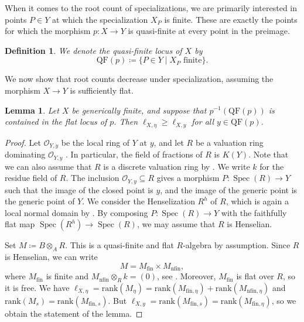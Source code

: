 \documentclass[12pt,reqno,a4paper]{amsart}
\theoremstyle{theoremstyle}
\newtheorem{lemma}[theorem]{Lemma}
\theoremstyle{examplestyle}
\newtheorem{definition}[theorem]{Definition}
\theoremstyle{algorithmstyle}
\DeclareMathOperator{\Spec}{Spec}
\begin{document}
When it comes to the root count of specializations, we are primarily interested in points $P\in Y$ at which the specialization $X_P$ is finite.  These are exactly the points for which the morphism $p\colon X\rightarrow Y$ is quasi-finite at every point in the preimage.

\begin{definition}
  \label{def:quasiFiniteLocus}
  We denote the \emph{quasi-finite locus} of $X$ by
  \begin{equation*}
    \mathrm{QF}(p)\coloneqq\{P\in{Y}\mid X_P \text{ finite}\}.
  \end{equation*}
\end{definition}

We now show that root counts decrease under specialization, assuming the morphism $X\rightarrow Y$ is sufficiently flat.

\begin{lemma}\label{lem:GRCDecreases2}
  Let $X$ be generically finite, and suppose that $p^{-1}(\mathrm{QF}(p))$ is contained in the flat locus of $p$.  Then $\ell_{X,\eta}\geq{\ell_{X,y}}$ for all $y\in{\mathrm{QF}(p)}$.
\end{lemma}
\begin{proof}
 Let $\mathcal{O}_{Y,y}$ be the local ring of $Y$ at $y$, and let $R$ be a valuation ring dominating $\mathcal{O}_{Y,y}$ \cite[\href{https://stacks.math.columbia.edu/tag/00IA}{Lemma 00IA}]{stacks-project}. In particular, the field of fractions of $R$ is $K(Y)$. Note that we can also assume that $R$ is a discrete valuation ring by \cite[\href{https://stacks.math.columbia.edu/tag/00PH}{Lemma 00PH}]{stacks-project}. We write $k$ for the residue field of $R$. The inclusion $\mathcal{O}_{Y,y}\subseteq R$ gives a morphism $P\colon\Spec(R)\to Y$ such that the image of the closed point is $y$, and the image of the generic point is the generic point of $Y$. We consider the Henselization $R^{h}$ of $R$, which is again a local normal domain by \cite[\href{https://stacks.math.columbia.edu/tag/06DI}{Lemma 06DI}]{stacks-project}. By composing $P\colon\Spec(R)\to Y$ with the faithfully flat map $\Spec(R^{h})\to \Spec(R)$, we may assume that $R$ is Henselian.     %
%

 Set $M\coloneqq B\otimes_A R$. %
 This is a quasi-finite and flat $R$-algebra by assumption. %
 Since $R$ is Henselian, we can write
 \begin{equation*}
     M=M_{\mathrm{fin}}\times{M_{\mathrm{nfin}}},
 \end{equation*}
 where $M_{\mathrm{fin}}$ is finite and $M_{\mathrm{nfin}}\otimes_{R}{k}=(0)$, see \cite[\href{https://stacks.math.columbia.edu/tag/04GG}{Lemma 04GG, part 13}]{stacks-project}.  Moreover, $M_{\mathrm{fin}}$ is flat over $R$, so it is free.  We have $\ell_{X,\eta}=\mathrm{rank}(M_{\eta})=\mathrm{rank}(M_{\mathrm{fin},\eta})+\mathrm{rank}(M_{\mathrm{nfin},\eta})$ and $\mathrm{rank}(M_{s})=\mathrm{rank}(M_{\mathrm{fin},s})$. But $\ell_{X,y}=\mathrm{rank}(M_{\mathrm{fin},s})=\mathrm{rank}(M_{\mathrm{fin},\eta})$, so we obtain the statement of the lemma.
\end{proof}
\end{document}
